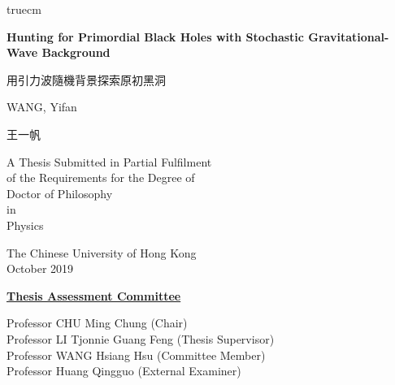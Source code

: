\marginparsep 0pt
 truecm

%

\setlength{\baselineskip}{0.780cm}


\pagestyle{empty}
\begin{center}
\Large{ \bf Hunting for Primordial Black Holes with Stochastic Gravitational-Wave Background }

\Large{ 用引力波隨機背景探索原初黑洞 }
\end{center}


\vspace{20mm}
\begin{center}
WANG, Yifan

王一帆
\end{center}


\vspace{20mm}
\begin{center}
A Thesis Submitted in Partial Fulfilment \\
of the Requirements for the Degree of \\
 Doctor of Philosophy \\
 in \\
 Physics
\end{center}


\vspace{20mm}
\begin{center}
The Chinese University of Hong Kong\\
October 2019
\end{center}

\newcommand{\committee}[1]{\def\@committee{#1}}
\newcommand{\thecommittee}{\@committee}
\committee{
	Professor CHU Ming Chung (Chair)\\
	Professor LI Tjonnie Guang Feng (Thesis Supervisor)\\
	Professor WANG Hsiang Hsu (Committee Member)\\
	Professor Huang Qingguo (External Examiner)
}

\newpage
	\thispagestyle{empty}
	
	\begin{center}
		\vspace*{1cm}
		\vfill
		\underline{\bf Thesis Assessment Committee}
		\vskip 1.5cm
		{
			\thecommittee
		}
		\vfill
		\vspace*{8cm}
	\end{center}
	
